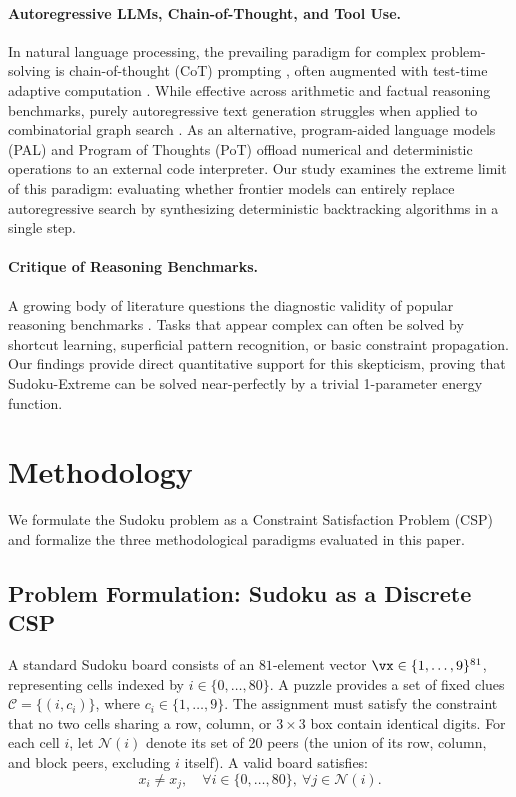 \documentclass{article} %
\begin{document}
\paragraph{Autoregressive LLMs, Chain-of-Thought, and Tool Use.}
In natural language processing, the prevailing paradigm for complex problem-solving is chain-of-thought (CoT) prompting \citep{wei2022chain, kojima2022large}, often augmented with test-time adaptive computation \citep{lightman2023lets}. While effective across arithmetic and factual reasoning benchmarks, purely autoregressive text generation struggles when applied to combinatorial graph search \citep{dziri2023faith, valmeekam2023planning}. As an alternative, program-aided language models (PAL) \citep{gao2023pal} and Program of Thoughts (PoT) \citep{chen2022program} offload numerical and deterministic operations to an external code interpreter. Our study examines the extreme limit of this paradigm: evaluating whether frontier models can entirely replace autoregressive search by synthesizing deterministic backtracking algorithms in a single step.

\paragraph{Critique of Reasoning Benchmarks.}
A growing body of literature questions the diagnostic validity of popular reasoning benchmarks \citep{marcus2020next, slabas2023benchmarking}. Tasks that appear complex can often be solved by shortcut learning, superficial pattern recognition, or basic constraint propagation. Our findings provide direct quantitative support for this skepticism, proving that Sudoku-Extreme can be solved near-perfectly by a trivial 1-parameter energy function.

\section{Methodology}
\label{sec:method}

We formulate the Sudoku problem as a Constraint Satisfaction Problem (CSP) and formalize the three methodological paradigms evaluated in this paper.

\subsection{Problem Formulation: Sudoku as a Discrete CSP}
A standard Sudoku board consists of an $81$-element vector $\vx \in \{1, \dots, 9\}^{81}$, representing cells indexed by $i \in \{0, \dots, 80\}$. A puzzle provides a set of fixed clues $\mathcal{C} = \{(i, c_i)\}$, where $c_i \in \{1, \dots, 9\}$. The assignment must satisfy the constraint that no two cells sharing a row, column, or $3 \times 3$ box contain identical digits. For each cell $i$, let $\mathcal{N}(i)$ denote its set of 20 peers (the union of its row, column, and block peers, excluding $i$ itself). A valid board satisfies:
\begin{equation}
x_i \neq x_j, \quad \forall i \in \{0, \dots, 80\}, \ \forall j \in \mathcal{N}(i).
\end{equation}
\end{document}
